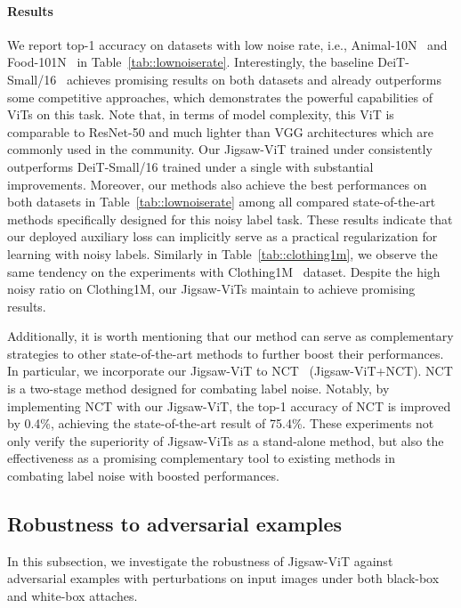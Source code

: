 \documentclass{article}
\begin{document}
\paragraph{Results} 
We report top-1 accuracy on datasets with low noise rate, i.e., Animal-10N~\cite{song2019selfie} and Food-101N~\cite{lee2018cleannet} in Table~\ref{tab::lownoiserate}. 
Interestingly, the baseline DeiT-Small/16~\cite{touvron2021training} achieves promising results on both datasets and already outperforms some competitive approaches, which demonstrates the powerful capabilities of ViTs on this task. 
Note that, in terms of model complexity, this ViT is comparable to ResNet-50 and much lighter than VGG architectures which are commonly used in the community.
Our Jigsaw-ViT trained under  consistently outperforms DeiT-Small/16 trained under a single  with substantial improvements.
Moreover, our methods also achieve the best performances on both datasets in Table~\ref{tab::lownoiserate} among all compared state-of-the-art methods specifically designed for this noisy label task.
These results indicate that our deployed auxiliary loss can implicitly serve as a practical regularization for learning with noisy labels. 
Similarly in Table~\ref{tab::clothing1m}, we observe the same tendency on the experiments with Clothing1M~\cite{xiao2015learning} dataset.
Despite the high noisy ratio on Clothing1M, our Jigsaw-ViTs maintain to achieve promising results.

Additionally, it is worth mentioning that our method can serve as complementary strategies to other state-of-the-art methods to further boost their performances.
In particular, we incorporate our Jigsaw-ViT to NCT~\cite{chen2021boosting} ({Jigsaw-ViT+NCT}).
NCT is a two-stage method designed for combating label noise. 
Notably, by implementing NCT with our Jigsaw-ViT, the top-1 accuracy of NCT is improved by 0.4\%, achieving the state-of-the-art result of 75.4\%.
These experiments not only verify the superiority of Jigsaw-ViTs as a stand-alone method, but also the effectiveness as a promising complementary tool to existing methods in combating label noise with boosted performances.

\subsection{Robustness to adversarial examples}
\label{subsec::adv}
In this subsection, we investigate the robustness of Jigsaw-ViT against adversarial examples with perturbations on input images under both black-box and white-box attaches.
\end{document}
